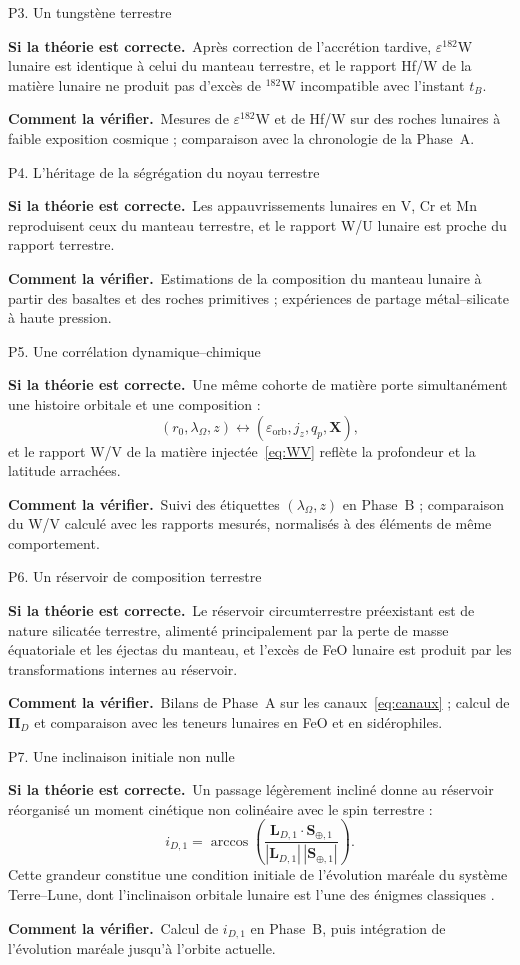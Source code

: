\documentclass[11pt,a4paper,openany]{report}
\newcommand{\sila}{\par\noindent\textbf{Si la théorie est correcte.}\ }
\newcommand{\verif}{\par\smallskip\noindent\textbf{Comment la vérifier.}\ }
\begin{document}
\begin{prediction}{P3. Un tungstène terrestre}
\sila Après correction de l'accrétion tardive, $\varepsilon^{182}$W lunaire est identique à celui du
manteau terrestre, et le rapport Hf/W de la matière lunaire ne produit pas d'excès de $^{182}$W
incompatible avec l'instant $t_B$.
\verif Mesures de $\varepsilon^{182}$W et de Hf/W sur des roches lunaires à faible exposition
cosmique ; comparaison avec la chronologie de la Phase~A.
\end{prediction}

\begin{prediction}{P4. L'héritage de la ségrégation du noyau terrestre}
\sila Les appauvrissements lunaires en V, Cr et Mn reproduisent ceux du manteau terrestre, et le
rapport W/U lunaire est proche du rapport terrestre.
\verif Estimations de la composition du manteau lunaire à partir des basaltes et des roches
primitives ; expériences de partage métal--silicate à haute pression.
\end{prediction}

\begin{prediction}{P5. Une corrélation dynamique--chimique}
\sila Une même cohorte de matière porte simultanément une histoire orbitale et une composition :
\begin{equation}
(r_0,\lambda_\Omega,z)\longleftrightarrow(\varepsilon_{\mathrm{orb}},j_z,q_p,\mathbf{X}),
\label{eq:correlation}
\end{equation}
et le rapport W/V de la matière injectée~\eqref{eq:WV} reflète la profondeur et la latitude
arrachées.
\verif Suivi des étiquettes $(\lambda_\Omega,z)$ en Phase~B ; comparaison du W/V calculé avec les
rapports mesurés, normalisés à des éléments de même comportement.
\end{prediction}

\begin{prediction}{P6. Un réservoir de composition terrestre}
\sila Le réservoir circumterrestre préexistant est de nature silicatée terrestre, alimenté
principalement par la perte de masse équatoriale et les éjectas du manteau, et l'excès de FeO
lunaire est produit par les transformations internes au réservoir.
\verif Bilans de Phase~A sur les canaux~\eqref{eq:canaux} ; calcul de
$\boldsymbol{\Pi}_D$ et comparaison avec les teneurs lunaires en FeO et en sidérophiles.
\end{prediction}

\begin{prediction}{P7. Une inclinaison initiale non nulle}
\sila Un passage légèrement incliné donne au réservoir réorganisé un moment cinétique non
colinéaire avec le spin terrestre :
\begin{equation}
i_{D,1}=\arccos\!\left(\frac{\mathbf{L}_{D,1}\cdot\mathbf{S}_{\oplus,1}}
{|\mathbf{L}_{D,1}|\,|\mathbf{S}_{\oplus,1}|}\right).
\label{eq:inclinaison}
\end{equation}
Cette grandeur constitue une condition initiale de l'évolution maréale du système Terre--Lune,
dont l'inclinaison orbitale lunaire est l'une des énigmes classiques \cite{PahlevanMorbidelli2015}.
\verif Calcul de $i_{D,1}$ en Phase~B, puis intégration de l'évolution maréale jusqu'à l'orbite
actuelle.
\end{prediction}
\end{document}
